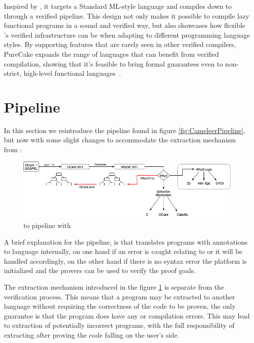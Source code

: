 Inspired by \compcert, it targets a Standard ML-style language and compiles down to \cml through a verified pipeline.
This design not only makes it possible to compile lazy functional programs in a sound and verified way, but also showcases 
how flexible \cml's verified infrastructure can be when adapting to different programming language styles. 
By supporting features that are rarely seen in other verified compilers, PureCake expands the range of languages that can 
benefit from verified compilation, showing that it's feasible to bring formal guarantees even to non-strict, high-level 
functional languages~\cite{KanabarVAMNPZ23, KanabarKM24}.

\section{Pipeline}
\label{sec:Pipeline}

In this section we reintroduce the \cameleer pipeline found in figure \ref{fig:CameleerPipeline}, but now with some slight changes
to accommodate the extraction mechanism from \whythree :

\begin{figure}[H]
    \centering
    \includegraphics[width=\linewidth]{images/Cameleer.png}
    \caption{\ocaml to \whyml pipeline with \cameleer}
    \label{fig:Cameleer_pipeline}
\end{figure}

A brief explanation for the pipeline, is that \cameleer translates \ocaml programs with \gospel annotations to \whyml language internally,
on one hand if an error is caught relating to \ocaml or \whyml it will be handled accordingly, on the other hand if there is no syntax error
the \whythree platform is initialized and the provers can be used to verify the proof goals.

The extraction mechanism introduced in the figure \ref{fig:Cameleer_pipeline} is separate from the verification process.
This means that a program may be extracted to another language without requiring the correctness of the code to be proven, 
the only guarantee is that the program does have any \ocaml or \gospel compilation errors. 
This may lead to extraction of potentially incorrect \ocaml programs, with the full responsibility of extracting after proving the
code falling on the user's side. 

